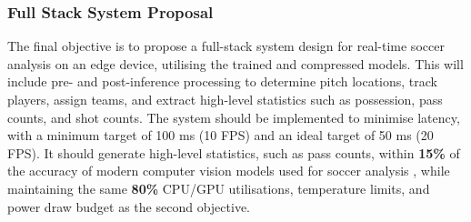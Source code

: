\subsubsection{Full Stack System Proposal} The final objective is to propose a full-stack system design for real-time soccer analysis on an edge device, utilising the trained and compressed models. This will include pre- and post-inference processing to determine pitch locations, track players, assign teams, and extract high-level statistics such as possession, pass counts, and shot counts. The system should be implemented to minimise latency, with a minimum target of 100 ms (10 FPS) and an ideal target of 50 ms (20 FPS). It should generate high-level statistics, such as pass counts, within \textbf{15\%} of the accuracy of modern computer vision models used for soccer analysis \cite{tracking}, while maintaining the same \textbf{80\%} CPU/GPU utilisations, temperature limits, and power draw budget as the second objective.

